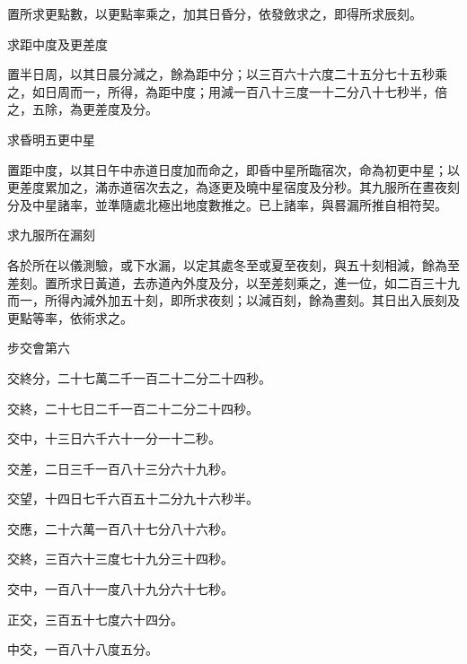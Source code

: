 \begin{pinyinscope}
 置所求更點數，以更點率乘之，加其日昏分，依發斂求之，即得所求辰刻。



 求距中度及更差度



 置半日周，以其日晨分減之，餘為距中分；以三百六十六度二十五分七十五秒乘之，如日周而一，所得，為距中度；用減一百八十三度一十二分八十七秒半，倍之，五除，為更差度及分。



 求昏明五更中星



 置距中度，以其日午中赤道日度加而命之，即昏中星所臨宿次，命為初更中星；以更差度累加之，滿赤道宿次去之，為逐更及曉中星宿度及分秒。其九服所在晝夜刻分及中星諸率，並準隨處北極出地度數推之。已上諸率，與晷漏所推自相符契。



 求九服所在漏刻



 各於所在以儀測驗，或下水漏，以定其處冬至或夏至夜刻，與五十刻相減，餘為至差刻。置所求日黃道，去赤道內外度及分，以至差刻乘之，進一位，如二百三十九而一，所得內減外加五十刻，即所求夜刻；以減百刻，餘為晝刻。其日出入辰刻及更點等率，依術求之。



 步交會第六



 交終分，二十七萬二千一百二十二分二十四秒。



 交終，二十七日二千一百二十二分二十四秒。



 交中，十三日六千六十一分一十二秒。



 交差，二日三千一百八十三分六十九秒。



 交望，十四日七千六百五十二分九十六秒半。



 交應，二十六萬一百八十七分八十六秒。



 交終，三百六十三度七十九分三十四秒。



 交中，一百八十一度八十九分六十七秒。



 正交，三百五十七度六十四分。



 中交，一百八十八度五分。




\end{pinyinscope}
